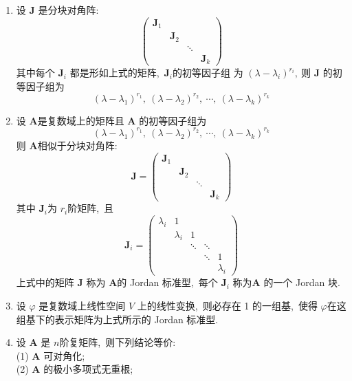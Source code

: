 \begin{enumerate}
		\item 设  $\boldsymbol{J}$  是分块对角阵:
		$$\left(\begin{array}{llll}
			\boldsymbol{J}_{1} & & & \\
			& \boldsymbol{J}_{2} & & \\
			& & \ddots & \\
			& & & \boldsymbol{J}_{k}
		\end{array}\right)$$
		其中每个  $\boldsymbol{J}_{i} $ 都是形如上式的矩阵,\   $\boldsymbol{J}_{i}  $的初等因子组 为  $\left(\lambda-\lambda_{i}\right)^{r_{i}} ,\  $则 $ \boldsymbol{J} $ 的初等因子组为
		$$\left(\lambda-\lambda_{1}\right)^{r_{1}},\ \left(\lambda-\lambda_{2}\right)^{r_{2}},\  \cdots,\ \left(\lambda-\lambda_{k}\right)^{r_{k}}$$
		\item 设  $\boldsymbol{A} $是复数域上的矩阵且 $ \boldsymbol{A} $ 的初等因子组为
		$$\left(\lambda-\lambda_{1}\right)^{r_{1}},\ \left(\lambda-\lambda_{2}\right)^{r_{2}},\  \cdots,\ \left(\lambda-\lambda_{k}\right)^{r_{k}}$$
		则 $ \boldsymbol{A}  $相似于分块对角阵:
		$$\boldsymbol{J}=\left(\begin{array}{llll}
			\boldsymbol{J}_{1} & & & \\
			& \boldsymbol{J}_{2} & & \\
			& & \ddots & \\
			& & & \boldsymbol{J}_{k}
		\end{array}\right)$$
		其中 $ \boldsymbol{J}_{i}  $为  $r_{i}  $阶矩阵,\  且
		$$\boldsymbol{J}_{i}=\left(\begin{array}{ccccc}
			\lambda_{i} & 1 & & & \\
			& \lambda_{i} & 1 & & \\
			& & \ddots & \ddots & \\
			& & & \ddots & 1 \\
			& & & & \lambda_{i}
		\end{array}\right)$$
		上式中的矩阵  $\boldsymbol{J} $ 称为 $ \boldsymbol{A}  $的 Jordan 标准型,\  每个  $\boldsymbol{J}_{i}$  称为$  \boldsymbol{A} $ 的一个 Jordan 块.
		\item 设  $\varphi $ 是复数域上线性空间  $V $ 上的线性变换,\  则必存在 1 的一组基,\  使得  $\varphi  $在这组基下的表示矩阵为上式所示的 Jordan 标准型.
		\item 设  $\boldsymbol{A}$  是 $ n $阶复矩阵,\  则下列结论等价:\\
		(1)  $\boldsymbol{A} $ 可对角化;\\
		(2)  $\boldsymbol{A}$  的极小多项式无重根;\\

\end{enumerate}
